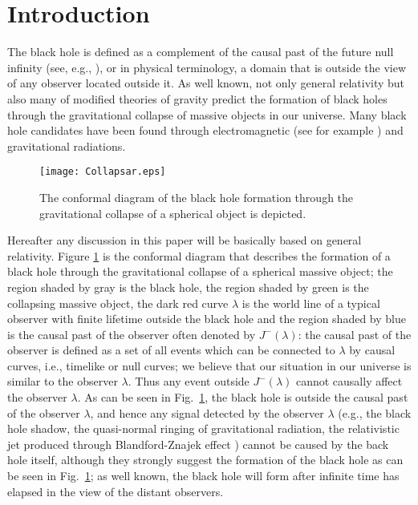 \documentclass[aps,preprint,preprintnumber,nofootinbib,amsmath,amssymb,ascmac,bm,12pt]{revtex4}
\begin{document}
\date{\today}
\maketitle


\section{Introduction}\label{sec:Intro}

The black hole is defined as a complement of the causal past of the 
future null infinity (see, e.g., \cite{Hawking,Wald}), or in physical terminology, 
a domain that is outside the view of any observer located outside it.  As well known, not only 
general relativity but also many of modified theories of gravity predict the formation of 
black holes through the gravitational collapse of massive objects in our universe. 
Many black hole candidates have been found through electromagnetic 
(see for example \cite{EMW}) and gravitational radiations\cite{GW}. 

\begin{figure}[!h]
\centering\texttt{[image: Collapsar.eps]}
\caption{ The conformal diagram of the black hole formation through the gravitational collapse of a 
spherical object is depicted. }
\label{collapsar}
\end{figure}


Hereafter any discussion in this paper will be basically based on general relativity. 
Figure \ref{collapsar} is the conformal diagram 
that describes the formation of a black hole through the gravitational collapse of 
a spherical massive object; the region shaded by gray is the black hole, the region 
shaded by green is the collapsing massive object,  the dark red curve $\lambda$ 
is the world line of a typical observer with finite lifetime outside the black hole  
and the region shaded by blue is the causal past of the observer often denoted by 
$J^-(\lambda)$: the causal past of the 
observer is defined as a set of all events which can be connected to 
$\lambda$ by causal curves, i.e., timelike or null curves; we believe that our situation in our universe 
is similar to the observer $\lambda$.  
Thus any event outside $J^-(\lambda)$ cannot causally affect the observer $\lambda$.  
As can be seen in Fig.~\ref{collapsar}, the black hole is outside the causal past of the observer $\lambda$, 
and hence  any signal detected by the observer $\lambda$    
(e.g., the black hole shadow, the quasi-normal ringing of gravitational 
radiation, the relativistic jet produced through Blandford-Znajek effect \cite{Blandford:1977}) 
cannot be caused by the back hole itself, although they strongly suggest 
the formation of the black hole as can be seen in Fig.~\ref{collapsar}; as well known, 
the black hole will form after infinite time has elapsed in the view of the distant observers. 
\end{document}
